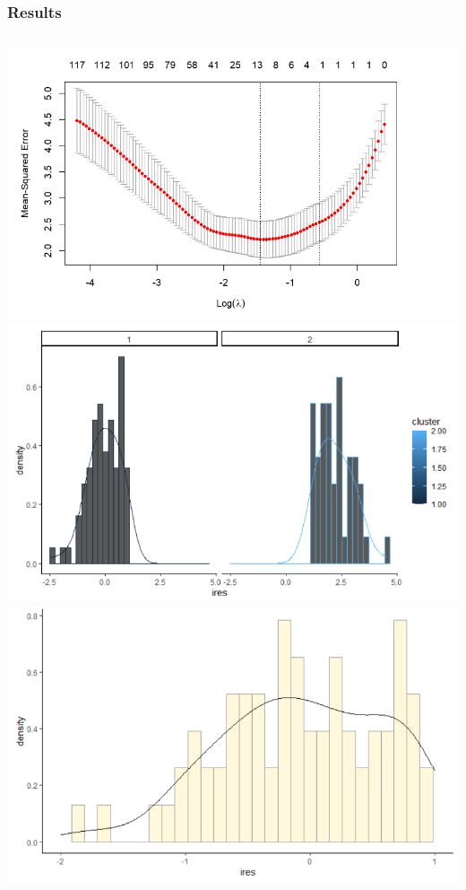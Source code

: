 \documentclass[hyperref={pdfpagelabels=false}]{beamer}
\begin{document}
\begin{frame}
	\frametitle{Results}
		\begin{columns}[t]
			\centering
			\includegraphics[width = \textwidth]{fig/ChenCV.png}\\
			\includegraphics[width = \textwidth]{fig/ChenOnemode.png}
			\centering
			\includegraphics[width = \textwidth]{fig/ChenTwomode.png}\\

\end{columns}
\end{frame}
\end{document}
